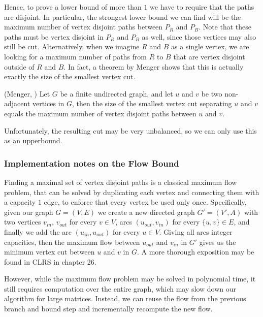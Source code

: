 \documentclass{article}
\begin{document}
	Hence, to prove a lower bound of more than $1$ we have to require that the
	paths are disjoint. In particular, the
	strongest lower bound we can find will be the maximum number of vertex
	disjoint paths between $P_R$ and $P_B$. Note that these paths must be
	vertex disjoint in $P_R$ and $P_B$ as well, since those vertices may also
	still be cut. Alternatively, when we imagine $R$ and $B$ as a single
	vertex, we are looking for a maximum number of paths from $R$ to $B$ that
	are vertex disjoint outside of $R$ and $B$. In fact, a theorem by Menger
	shows that this is actually exactly the size of the smallest vertex cut.

	\begin{theorem}{(Menger, \cite{})}
		Let $G$ be a finite undirected graph, and let $u$ and $v$ be two
		non-adjacent vertices in $G$, then the size of the smallest vertex cut
		separating $u$ and $v$ equals the maximum number of vertex disjoint
		paths between $u$ and $v$.
	\end{theorem}

	Unfortunately, the resulting cut may be very unbalanced, so we can only
	use this as an upperbound.

	\subsubsection{Implementation notes on the Flow Bound}

	Finding a maximal set of vertex disjoint paths is a classical maximum flow
	problem, that can be solved by duplicating each vertex and connecting them
	with a capacity $1$ edge, to enforce that every vertex be used only once.
	Specifically, given our graph $G = (V, E)$ we create
	a new directed graph $G' = (V', A)$ with two vertices $v_{in}$, $v_{out}$
	for every $v \in V$, arcs $(u_{out}, v_{in})$ for every $\{u, v\} \in E$,
	and finally we add the arc $(u_{in}, u_{out})$ for every $u \in V$.
	Giving all arcs integer capacities, then the maximum flow between
	$u_{out}$ and $v_{in}$ in $G'$ gives us the minimum vertex cut between
	$u$ and $v$ in $G$.
	A more thorough exposition may be found in \cite{} CLRS
	in chapter 26.

	However, while the maximum flow problem may be solved in polynomial time,
	it still requires computation over the entire graph, which may slow down
	our algorithm for large matrices. Instead, we can reuse the flow from the
	previous branch and bound step and incrementally recompute the new flow.
\end{document}
